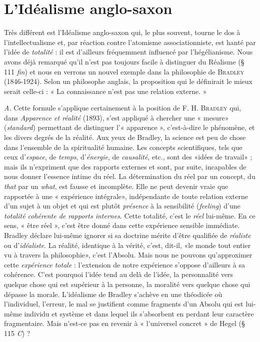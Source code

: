 \section{L’Idéalisme anglo-saxon}%
Très différent est l’Idéalisme
anglo-saxon qui, le plus souvent, tourne le dos à l’intellectualisme
et, par réaction contre l’atomisme associationniste, est hanté par
l'idée de {\it totalité} : il est d’ailleurs fréquemment influencé par l’hégélianisme.
Nous avons déjà remarqué qu’il n’est pas toujours facile à
distinguer du Réalisme (§ 111 {\it fin}) et nous en verrons un nouvel
exemple dans la philosophie de \textsc{Bradley} (1846-1924). Selon un philosophe
anglais, la proposition qui le définirait le mieux serait celle-ci :
« La connaissance n’est pas une relation externe. »

{\it A.} Cette formule s'applique certainement à la position de F. H. \textsc{Bradley}
qui, dans {\it Apparence et réalité} (1893), s'est appliqué à chercher une « mesure»
({\it standard}) permettant de distinguer l’« apparence », c’est-à-dire le phénomène,
et les divers degrés de la réalité. Aux yeux de Bradley, la science est
peu de chose dans l’ensemble de la spiritualité humaine. Les concepts
scientifiques, tels que ceux d’{\it espace}, de {\it temps}, d'{\it énergie}, de {\it causalité}, etc.,
sont des «idées de travail» ; mais ils n’expriment que des rapports externes
et sont, par suite, incapables de nous donner l'essence intime du réel. La
détermination du réel par un concept, du {\it that} par un {\it what}, est fausse et
incomplète. Elle ne peut devenir vraie que rapportée à une « expérience
intégrale», indépendante de toute relation externe d’un sujet à un objet
et qui est plutôt {\it présence} à la sensibilité ({\it feeling}) d’une \textsf{\textit {totalité cohérente
de rapports internes}}. Cette totalité, c’est le {\it réel} lui-même. En ce sens, « être
réel », c'est être donné dans cette expérience sensible immédiate. Bradley
déclare lui-même ignorer si sa doctrine mérite d’être qualifiée de {\it réaliste}
ou d’{\it idéaliste}. La réalité, identique à la vérité, c’est, dit-il, «le monde tout
entier vu à travers la philosophie», c’est l’Absolu. Mais nous ne pouvons
qu'approximer cette {\it expérience totale} : l'extension de notre expérience
s’oppose d’ailleurs à sa cohérence. C’est pourquoi l’idée tend au delà de
l'idée, la personnalité vers quelque chose qui est supérieur à la personne,
la moralité vers quelque chose qui dépasse la morale. L'idéalisme de
Bradley s'achève en une théodicée où l’individuel, l'erreur, le mal se justifient
comme fragments d’un Absolu qui est lui-même individu et système et
dans lequel ils s’absorbent en perdant leur caractère fragmentaire. Mais
n'est-ce pas en revenir à « l’universel concret » de Hegel (§ 115 {\it C}) ?


